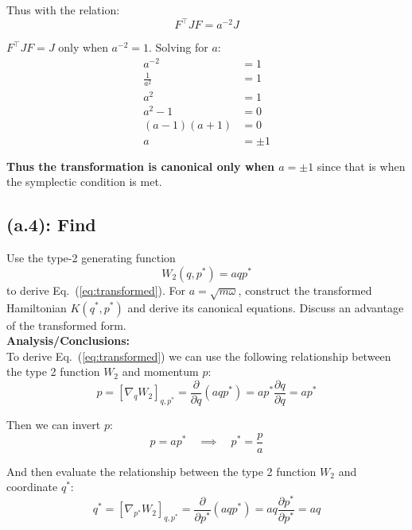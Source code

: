 \documentclass[titlepage]{article}
\begin{document}
\begin{mdframed}[linewidth=1pt, innertopmargin=10pt, innerbottommargin=10pt]
	Thus with the relation:
	\begin{equation}
		F^\top JF=a^{-2}J
	\end{equation}
	
	$F^\top JF=J$ only when $a^{-2}=1$. Solving for $a$:
	\begin{equation}
		\begin{split}
			a^{-2}&=1 \\
			\frac{1}{a^2}&=1 \\
			a^2&=1 \\
			a^2-1&=0 \\
			(a-1)(a+1)&=0 \\
			a&=\pm1
		\end{split}
	\end{equation}
	
	\textbf{Thus the transformation is canonical only when $a=\pm1$} since that is when the symplectic condition is met.
\end{mdframed}

\subsection*{(a.4): Find}

Use the type-2 generating function
\begin{equation}
	W_2(q,p^*)=aqp^*
\end{equation}
to derive Eq.~(\ref{eq:transformed}). For $a=\sqrt{m\omega}$, construct the transformed Hamiltonian $K(q^*,p^*)$ and derive its canonical equations. Discuss an advantage of the transformed form. \\

\textbf{Analysis/Conclusions:}\\

To derive Eq.~(\ref{eq:transformed}) we can use the following relationship between the type 2 function $W_2$ and momentum $p$:
\begin{equation}
	p=[\nabla_qW_2]_{q,p^*}=\frac{\partial}{\partial q}\left(aqp^*\right)=ap^*\frac{\partial q}{\partial q}=ap^*
\end{equation}

Then we can invert $p$:
\begin{equation}
	p=ap^*\quad\implies\quad p^*=\frac{p}{a}
	\label{eq:pstar}
\end{equation}

And then evaluate the relationship between the type 2 function $W_2$ and coordinate $q^*$:
\begin{equation}
	q^*	=[\nabla_{p^*}W_2]_{q,p^*}=\frac{\partial}{\partial p^*}\left(aqp^*\right)=aq\frac{\partial p^*}{\partial p^*}=aq
	\label{eq:qstar}
\end{equation}
\end{document}
